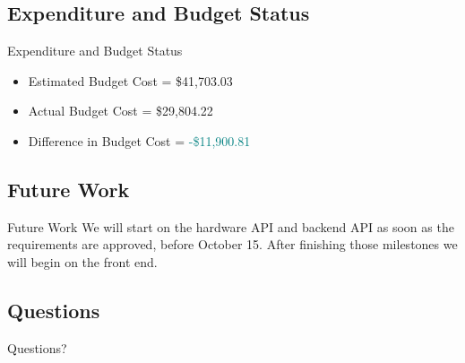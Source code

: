 \documentclass[17pt, aspectratio=169]{beamer}
\begin{document}
\subsection*{Expenditure and Budget Status}
\begin{frame}{Expenditure and Budget Status}
	\begin{itemize}
		\item Estimated Budget Cost = \$41,703.03
		\item Actual Budget Cost = \$29,804.22
		\item Difference in Budget Cost = \textcolor{teal}{-\$11,900.81}
	\end{itemize}
\end{frame}
\subsection{Future Work}
\begin{frame}{Future Work}
	We will start on the hardware API and backend API as soon as the requirements are approved, before October 15. After finishing those milestones we will begin on the front end.
\end{frame}
\subsection*{Questions}
\begin{frame}
	\begin{huge}
		\begin{center}
			Questions?
		\end{center}
	\end{huge}
\end{frame}
\end{document}

